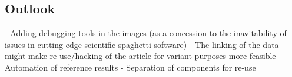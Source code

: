 \subsection{Outlook}
- Adding debugging tools in the images (as a concession to the inavitability of issues in cutting-edge scientific spaghetti software)
- The linking of the data might make re-use/hacking of the article for variant purposes more feasible
- Automation of reference results
- Separation of components for re-use
